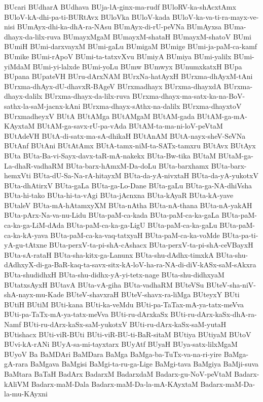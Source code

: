 {BUcari
BUdharA
BUdhava
BUja-lA-ginx-ma-rudf
BUloRV-ka-shAcxtAmx
BUloV-kA-dhi-pa-ti-BURtAvx
BUloVka
BUloV-kada
BUloV-ka-va-ti-ra-mayx-ve-nisi
BUmAyx-dhi-ka-dhA-ra-NAsu
BUmAyx-di-rU-peVNa
BUmAyxsa
BUma-dhayx-da-lilx-ruva
BUmayxMgaM
BUmayxM-shataH
BUmayxM-shatoV
BUmi
BUmiH
BUmi-darxvayxM
BUmi-gaLu
BUmigaM
BUmige
BUmi-ja-paM-ca-kamf
BUmike
BUmi-rApoV
BUmi-ta-tatxvXvu
BUmiyA
BUmiya
BUmi-yalilx
BUmi-yiMdaM
BUmi-yi-lalxde
BUmi-yoLu
BUmw
BUmwyx
BUnumxkatxH
BUpa
BUpana
BUpateVH
BUru-dArxNAM
BUrxNa-hatAyxH
BUrxma-dhAyxM-tAni
BUrxma-dhAyx-dU-dhavxR-BAgeV
BUrxmadhayx
BUrxma-dhayxdA
BUrxma-dhayx-dalilx
BUrxma-dhayx-da-lilx-ruva
BUrxma-dhayx-ma-satx-ka-na-BoV-sathx-la-saM-jacnx-kAni
BUrxma-dhayx-sAthx-na-dalilx
BUrxma-dhayxtoV
BUrxmadheyxV
BUtA
BUtAMga
BUtAMgaM
BUtAM-gada
BUtAM-ga-mA-KAyxtaM
BUtAM-ga-savx-rU-pa-vAda
BUtAM-ta-ma-ni-loV-peVtaM
BUtAdeVH
BUtA-di-satx-ma-sA-dhikaH
BUtAnAM
BUtA-nayx-sheV-SeVNa
BUtAnf
BUtAni
BUtAtAmx
BUtA-tamx-niM-ta-SATx-tamxru
BUtAvx
BUtAyx
BUta
BUta-Ba-vi-Sayx-davx-taR-mA-nakekx
BUta-Bw-tika
BUtaM
BUtaM-ga-La-dhaR-vadhaRM
BUta-barx-hAmxM-Da-doLu
BUta-barxhamx
BUta-barx-hemxVti
BUta-dU-Sa-Na-rA-hitayxM
BUta-da-yA-nivxtaH
BUta-da-yA-yukotxV
BUta-dhAtirxV
BUta-gaLa
BUta-ga-Lo-Dane
BUta-gaLu
BUta-ga-NA-dhiVsha
BUta-hi-tako
BUta-hi-ta-vAgi
BUta-jAcnxna
BUta-kAyaR
BUta-kA-yave
BUtaleV
BUta-mA-hAtamxyXM
BUta-nAtha
BUta-nA-thana
BUta-nA-yakAH
BUta-pArx-Na-va-nu-Lidu
BUta-paM-ca-kada
BUta-paM-ca-ka-gaLa
BUta-paM-ca-ka-ga-LiM-dAda
BUta-paM-ca-ka-ga-LigU
BUta-paM-ca-ka-gaLu
BUta-paM-ca-ka-kA-yava
BUta-paM-ca-ka-vaq-tatxyaH
BUta-paM-ca-ka-voMde
BUta-pa-ti-yA-gu-tAtxne
BUta-perxV-ta-pi-shA-cAshacx
BUta-perxV-ta-pi-shA-ceVBayxH
BUta-sA-rataH
BUta-sha-kitx-ga-Lanunx
BUta-shu-dAdhx-timxkA
BUta-shu-dAdhxyX-di-ga-BaR-kaq-ta-savx-sitx-kA-loV-ha-ra-NA-di-diV-kASx-saM-sAkxra
BUta-shudidhxH
BUta-shu-didhx-yA-yi-tetx-nage
BUta-shu-didhxyaM
BUtatxsAyxH
BUtavA
BUta-vA-giha
BUta-vadhaRM
BUteVSu
BUteV-sha-niV-shA-nayx-mu-Kade
BUteV-shavxraH
BUteV-shavx-ra-liMga
BUteyxY
BUti
BUtiH
BUtiM
BUti-kana
BUti-ka-veMdu
BUti-pa-TaTax-mA-ya-tatx-meVva
BUti-pa-TaTx-mA-ya-tatx-meVva
BUti-ru-dArxkaSx
BUti-ru-dArx-kaSx-dhA-ra-Namf
BUti-ru-dArx-kaSx-saM-yukotxV
BUti-ru-dArx-kaSx-saM-yutaH
BUtishacx
BUti-viR-BUti
BUti-viR-BU-ti-BaR-sitaM
BUtiya
BUtiyaM
BUtoV
BUvi-kA-rANi
BUyA-sa-mi-tayxtarx
BUyAtf
BUyaH
BUya-satx-lilxMgaM
BUyoV
Ba
BaMDAri
BaMDara
BaMga
BaMga-ba-TuTx-va-na-ri-yire
BaMga-gA-rara
BaMgava
BaMgisi
BaMgi-ta-ru-ga-Lige
BaMgi-tava
BaMgiya
BaMji-suva
BaMtara
BaTaH
BadArx
BadarxM
BadarxdaM
Badarx-gu-NoV-peVtaM
Badarx-kAliVM
Badarx-maM-Dala
Badarx-maM-Da-la-mA-KAyxtaM
Badarx-maM-Da-la-mu-KAyxni
}
